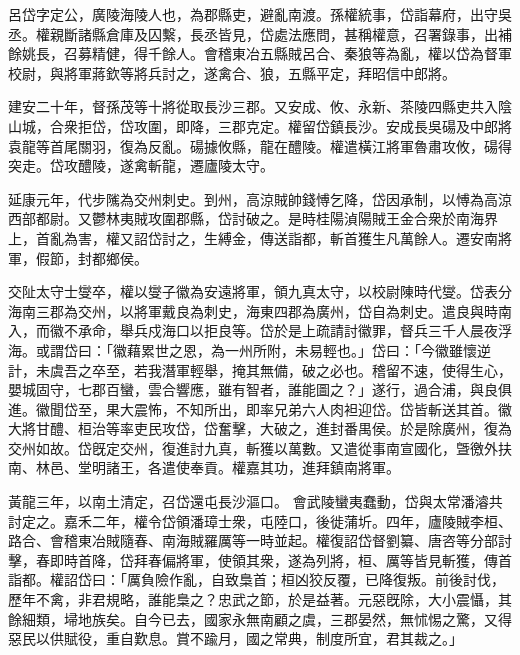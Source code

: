 \begin{pinyinscope}
 
 
 呂岱字定公，廣陵海陵人也，為郡縣吏，避亂南渡。孫權統事，岱詣幕府，出守吳丞。權親斷諸縣倉庫及囚繫，長丞皆見，岱處法應問，甚稱權意，召署錄事，出補餘姚長，召募精健，得千餘人。會稽東冶五縣賊呂合、秦狼等為亂，權以岱為督軍校尉，與將軍蔣欽等將兵討之，遂禽合、狼，五縣平定，拜昭信中郎將。
 
 
 
 
 
 
 建安二十年，督孫茂等十將從取長沙三郡。又安成、攸、永新、茶陵四縣吏共入陰山城，合衆拒岱，岱攻圍，即降，三郡克定。權留岱鎮長沙。安成長吳碭及中郎將袁龍等首尾關羽，復為反亂。碭據攸縣，龍在醴陵。權遣橫江將軍魯肅攻攸，碭得突走。岱攻醴陵，遂禽斬龍，遷廬陵太守。
 
 
 
 
 延康元年，代步隲為交州刺史。到州，高涼賊帥錢愽乞降，岱因承制，以愽為高涼西部都尉。又鬱林夷賊攻圍郡縣，岱討破之。是時桂陽湞陽賊王金合衆於南海界上，首亂為害，權又詔岱討之，生縛金，傳送詣都，斬首獲生凡萬餘人。遷安南將軍，假節，封都鄉侯。
 
 
 
 
 交阯太守士燮卒，權以燮子徽為安遠將軍，領九真太守，以校尉陳時代燮。岱表分海南三郡為交州，以將軍戴良為刺史，海東四郡為廣州，岱自為刺史。遣良與時南入，而徽不承命，舉兵戍海口以拒良等。岱於是上疏請討徽罪，督兵三千人晨夜浮海。或謂岱曰：「徽藉累世之恩，為一州所附，未易輕也。」岱曰：「今徽雖懷逆計，未虞吾之卒至，若我潛軍輕舉，掩其無備，破之必也。稽留不速，使得生心，嬰城固守，七郡百蠻，雲合響應，雖有智者，誰能圖之？」遂行，過合浦，與良俱進。徽聞岱至，果大震怖，不知所出，即率兄弟六人肉袒迎岱。岱皆斬送其首。徽大將甘醴、桓治等率吏民攻岱，岱奮擊，大破之，進封番禺侯。於是除廣州，復為交州如故。岱旣定交州，復進討九真，斬獲以萬數。又遣從事南宣國化，曁徼外扶南、林邑、堂明諸王，各遣使奉貢。權嘉其功，進拜鎮南將軍。
 
 
黃龍三年，以南土清定，召岱還屯長沙漚口。
 會武陵蠻夷蠢動，岱與太常潘濬共討定之。嘉禾二年，權令岱領潘璋士衆，屯陸口，後徙蒲圻。四年，廬陵賊李桓、路合、會稽東冶賊隨春、南海賊羅厲等一時並起。權復詔岱督劉纂、唐咨等分部討擊，春即時首降，岱拜春偏將軍，使領其衆，遂為列將，桓、厲等皆見斬獲，傳首詣都。權詔岱曰：「厲負險作亂，自致梟首；桓凶狡反覆，已降復叛。前後討伐，歷年不禽，非君規略，誰能梟之？忠武之節，於是益著。元惡旣除，大小震懾，其餘細類，埽地族矣。自今已去，國家永無南顧之虞，三郡晏然，無怵惕之驚，又得惡民以供賦役，重自歎息。賞不踰月，國之常典，制度所宜，君其裁之。」
 

\end{pinyinscope}
